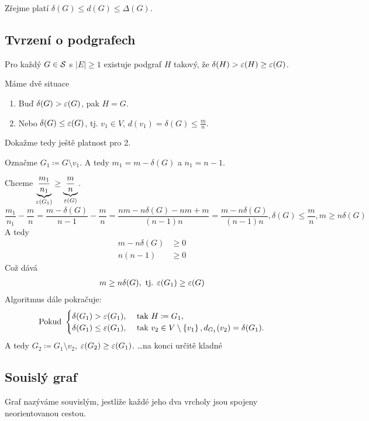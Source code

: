 Zřejme platí $\delta(G) \leq d(G) \leq \Delta(G)$.

\subsection{Tvrzení o podgrafech}
 Pro každý $G \in \S$ s $|E| \geq 1$ existuje podgraf $H$ takový, že $\delta(H) > \eps(H) \geq \eps(G)$.

 Máme dvě situace
\begin{enumerate}
    \item Buď $\delta(G) > \eps(G)$, pak $H=G$.
    \item Nebo $\delta(G) \leq \eps(G)$, tj. $v_1 \in V$, $d(v_1) = \delta(G) \leq \frac{m}{n}$.
\end{enumerate}
Dokažme tedy ještě platnost pro 2.

Označme $G_1 \coloneq G \setminus v_1$. A tedy $m_1 = m - \delta(G)$ a $n_1 = n - 1$.

Chceme $\underbrace{\frac{m_1}{n_1}}_{\eps(G_1)} \geq \underbrace{\frac{m}{n}}_{\eps(G)}$.
\begin{equation}
    \frac{m_1}{n_1} - \frac{m}{n} = \frac{m-\delta(G)}{n-1} - \frac{m}{n} = \frac{nm - n\delta(G) - nm + m}{(n-1)n}
    = \frac{m-n\delta(G)}{(n-1)n}, \delta(G) \leq \frac{m}{n}, m \geq n \delta(G)
\end{equation}
A tedy
\begin{align*}
    m-n\delta(G) &\geq 0 \\
    n(n-1) &\geq 0
\end{align*}
Což dává
\begin{align*}
    m \geq n \delta(G), \text{ tj. } \eps(G_1) \geq \eps(G)
\end{align*}
Algoritmus dále pokračuje:
\[
\text{Pokud }
\begin{cases}
    \delta(G_1) > \eps(G_1), &\text{ tak } H \coloneq G_1, \\
    \delta(G_1) \leq \eps(G_1), &\text{ tak } v_2 \in V \setminus \bc{v_1}, d_{G_1}(v_2) = \delta(G_1).
\end{cases}
\]
A tedy $G_2 \coloneq G_1 \setminus v_2$, $\eps(G_2) \geq \eps(G_1)$.
\dots na konci určitě kladné %

\subsection{Souislý graf}\label{souvisly}
Graf nazýváme souvislým, jestliže každé jeho dva vrcholy jsou spojeny neorientovanou cestou. 


